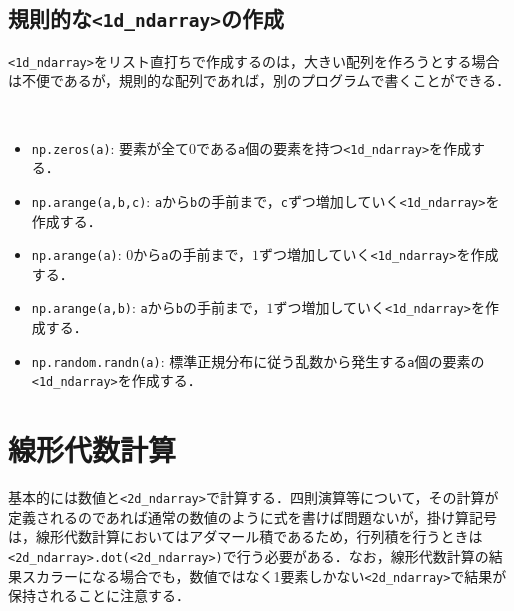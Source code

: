 \subsection{規則的な\texttt{<1d\_ndarray>}の作成}
\texttt{<1d\_ndarray>}をリスト直打ちで作成するのは，大きい配列を作ろうとする場合は不便であるが，規則的な配列であれば，別のプログラムで書くことができる．

\begin{gram}　
\begin{itemize}
\item \texttt{np.zeros(a)}: 要素が全て0である\texttt{a}個の要素を持つ\texttt{<1d\_ndarray>}を作成する．
\item \texttt{np.arange(a,b,c)}: \texttt{a}から\texttt{b}の手前まで，\texttt{c}ずつ増加していく\texttt{<1d\_ndarray>}を作成する．
\item \texttt{np.arange(a)}: $0$から\texttt{a}の手前まで，$1$ずつ増加していく\texttt{<1d\_ndarray>}を作成する．
\item \texttt{np.arange(a,b)}: \texttt{a}から\texttt{b}の手前まで，$1$ずつ増加していく\texttt{<1d\_ndarray>}を作成する．
\item \texttt{np.random.randn(a)}: 標準正規分布に従う乱数から発生する\texttt{a}個の要素の\texttt{<1d\_ndarray>}を作成する．
\end{itemize}
\end{gram}

\begin{cod}[\texttt{num2.py}]　
}]{code/num2.py}
\vspace{-10pt}
\begin{lstlisting}
v=[0. 0. 0. 0. 0.]
w=[ 0  2  4  6  8 10 12 14 16 18 20 22 24 26 28]
x=[0 1 2 3 4 5 6 7 8 9]
y=[-10  -9  -8  -7  -6  -5  -4  -3  -2  -1   0]
z=[-0.38558831  1.20391439  1.18496279  1.50358118  0.93103295 -0.02233168
  0.04894498  0.20757944 -2.67874618 -1.90888007]
\end{lstlisting}
\end{cod}
\vspace{-10pt}

\section{線形代数計算}

基本的には数値と\texttt{<2d\_ndarray>}で計算する．四則演算等について，その計算が定義されるのであれば通常の数値のように式を書けば問題ないが，掛け算記号は，線形代数計算においてはアダマール積であるため，行列積を行うときは\texttt{<2d\_ndarray>.dot(<2d\_ndarray>)}で行う必要がある．なお，線形代数計算の結果スカラーになる場合でも，数値ではなく1要素しかない\texttt{<2d\_ndarray>}で結果が保持されることに注意する．

